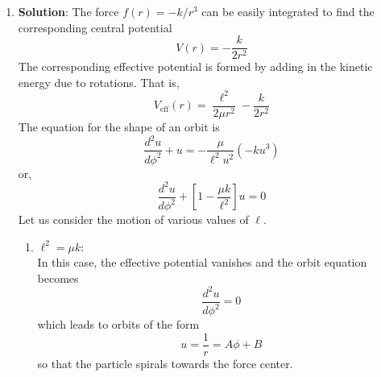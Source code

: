 \documentclass[usletter, 12pt]{article}
\begin{document}
\begin{enumerate}[leftmargin=0em, label=\textbf{\arabic*}.]
\item \textbf{Solution}:\vspace{3em}
  \noindent The force $f(r)=-k/r^3$ can be easily integrated to find the
  corresponding central potential
  \begin{equation}
    V(r) = -\frac{k}{2r^2}
  \end{equation}
  The corresponding effective potential is formed by adding in the kinetic
  energy due to rotations. That is,
  \begin{equation}
    V_\text{eff}(r) = \frac{\ell^2}{2\mu r^2}-\frac{k}{2r^2}
  \end{equation}
  The equation for the shape of an orbit is
  \begin{equation}
    \frac{d^2u}{d\phi^2} + u = -\frac{\mu}{\ell^2u^2}\left(-ku^3 \right)
  \end{equation}
  or,
  \begin{equation}
    \frac{d^2u}{d\phi^2} + \left[ 1 - \frac{\mu k}{\ell^2} \right]u = 0
  \end{equation}
  Let us consider the motion of various values of $\ell$.

  
  \begin{enumerate}[leftmargin=2em, label=(\textbf{\alph*})]
  \item $\ell^2=\mu k$: \\
    \noindent In this case, the effective potential vanishes and the orbit
    equation becomes
    \begin{equation}
      \frac{d^2u}{d\phi^2}=0
    \end{equation}
    which leads to orbits of the form
    \begin{equation}
      u = \frac{1}{r} = A\phi + B
    \end{equation}
    so that the particle spirals towards the force center.\\


\end{enumerate}
\end{enumerate}
\end{document}

